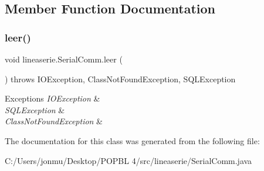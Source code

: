 \subsection{Member Function Documentation}
\mbox{\label{classlineaserie_1_1_serial_comm_a9e5dc899a435cb7bbd14c50af1e69a9e}} 
\subsubsection{\texorpdfstring{leer()}{leer()}}
{\footnotesize\ttfamily void lineaserie.\+Serial\+Comm.\+leer (\begin{DoxyParamCaption}{ }\end{DoxyParamCaption}) throws I\+O\+Exception, Class\+Not\+Found\+Exception, S\+Q\+L\+Exception}


\begin{DoxyExceptions}{Exceptions}
{\em I\+O\+Exception} & ~\newline
\\
\hline
{\em S\+Q\+L\+Exception} & \\
\hline
{\em Class\+Not\+Found\+Exception} & \\
\hline
\end{DoxyExceptions}


The documentation for this class was generated from the following file\+:\begin{DoxyCompactItemize}
\item 
C\+:/\+Users/jonmu/\+Desktop/\+P\+O\+P\+B\+L 4/src/lineaserie/Serial\+Comm.\+java\end{DoxyCompactItemize}

